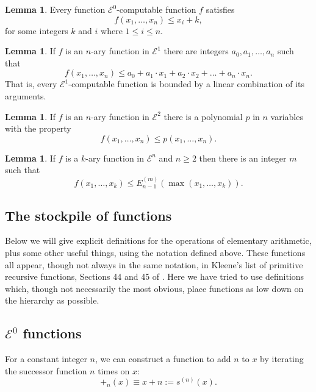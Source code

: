 \documentclass[a4paper]{article}
\newcommand{\grz}[1]{$\mathcal{E}^{#1}$}	%
\theoremstyle{plain}
\theoremstyle{definition}
\newtheorem{lemma}[theorem]{Lemma}
\begin{document}
\begin{lemma} \cite[Lemma 2.2.5]{Rose_1984}
	Every function \grz{0}-computable function $f$ satisfies
	\[ f(x_1, \dots, x_n) \leq x_i + k, \]
	for some integers $k$ and $i$ where $1 \leq i \leq n$.
\end{lemma}

\begin{lemma} \cite[Lemma 2.2.6]{Rose_1984}
	If $f$ is an $n$-ary function in \grz{1} there are integers $a_0,a_1, \dots,a_n$ such that
	\[f(x_1,\dots,x_n) \leq a_0 + a_1 \cdot x_1 + a_2 \cdot x_2 + \dots + a_n \cdot x_n. \]
	That is, every \grz{1}-computable function is bounded by a linear combination of its arguments.
\end{lemma}

\begin{lemma} \cite[Lemma 2.2.7]{Rose_1984}
	If $f$ is an $n$-ary function in \grz{2} there is a polynomial $p$ in $n$ variables with the property
	\[f(x_1, \dots,x_n) \leq p(x_1, \dots, x_n). \]
\end{lemma}

\begin{lemma} \cite[Lemma 2.2.9]{Rose_1984}
	If $f$ is a $k$-ary function in \grz{n} and $n \geq 2$ then there is an integer $m$ such that
	\[f(x_1, \dots, x_k) \leq E_{n-1}^{(m)}(\max(x_1, \dots, x_k)).\]
\end{lemma}

\subsection{The stockpile of functions}
Below we will give explicit definitions for the operations of elementary arithmetic, plus some other useful things, using the notation defined above.
These functions all appear, though not always in the same notation, in
Kleene's list of primitive recursive functions, Sections 44 and 45 of 
\cite{Kleene52}. Here   
we have tried to use definitions which, though not necessarily 
the most obvious, place functions as low down on the hierarchy as possible. 

\subsection{\grz{0} functions}
For a constant integer $n$, we can construct a function to add $n$ to $x$ by iterating the successor function $n$ times on $x$:
\begin{equation} +_n(x) \equiv x + n := s^{(n)}(x). \end{equation}
\end{document}
